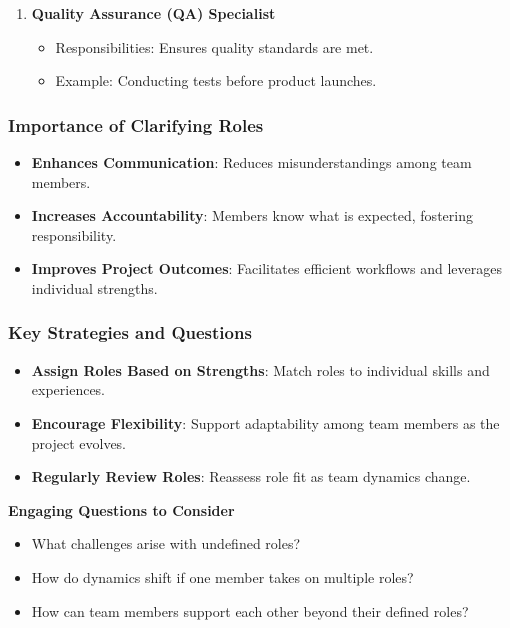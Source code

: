\documentclass[aspectratio=169]{beamer}
\begin{document}
\begin{frame}[fragile]
\begin{enumerate}
        \item \textbf{Quality Assurance (QA) Specialist}
            \begin{itemize}
                \item Responsibilities: Ensures quality standards are met.
                \item Example: Conducting tests before product launches.
            \end{itemize}
    \end{enumerate}
\end{frame}

\begin{frame}[fragile]
    \frametitle{Importance of Clarifying Roles}
    \begin{itemize}
        \item \textbf{Enhances Communication}: Reduces misunderstandings among team members.
        \item \textbf{Increases Accountability}: Members know what is expected, fostering responsibility.
        \item \textbf{Improves Project Outcomes}: Facilitates efficient workflows and leverages individual strengths.
    \end{itemize}
\end{frame}

\begin{frame}[fragile]
    \frametitle{Key Strategies and Questions}
    \begin{itemize}
        \item \textbf{Assign Roles Based on Strengths}: Match roles to individual skills and experiences.
        \item \textbf{Encourage Flexibility}: Support adaptability among team members as the project evolves.
        \item \textbf{Regularly Review Roles}: Reassess role fit as team dynamics change.
    \end{itemize}
    
    \textbf{Engaging Questions to Consider}
    \begin{itemize}
        \item What challenges arise with undefined roles?
        \item How do dynamics shift if one member takes on multiple roles?
        \item How can team members support each other beyond their defined roles?
    \end{itemize}
\end{frame}
\end{document}
